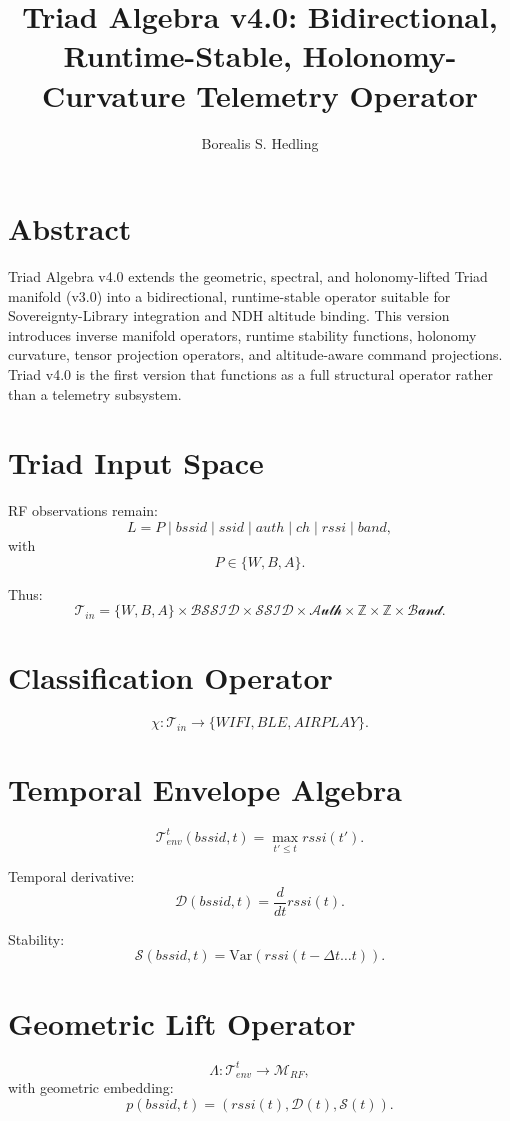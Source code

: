 \documentclass[11pt]{article}
\title{Triad Algebra v4.0: Bidirectional, Runtime-Stable, Holonomy-Curvature Telemetry Operator}
\author{Borealis S. Hedling}
\date{}
\begin{document}
\maketitle

\section*{Abstract}
Triad Algebra v4.0 extends the geometric, spectral, and holonomy-lifted Triad
manifold (v3.0) into a bidirectional, runtime-stable operator suitable for
Sovereignty-Library integration and NDH altitude binding. This version introduces
inverse manifold operators, runtime stability functions, holonomy curvature,
tensor projection operators, and altitude-aware command projections. Triad v4.0
is the first version that functions as a full structural operator rather than a
telemetry subsystem.

\section{Triad Input Space}
RF observations remain:
\[
L = P \mid bssid \mid ssid \mid auth \mid ch \mid rssi \mid band,
\]
with
\[
P \in \{W, B, A\}.
\]

Thus:
\[
\mathcal{T}_{in}
= \{W,B,A\}
\times \mathcal{BSSID}
\times \mathcal{SSID}
\times \mathcal{Auth}
\times \mathbb{Z}
\times \mathbb{Z}
\times \mathcal{Band}.
\]

\section{Classification Operator}
\[
\chi : \mathcal{T}_{in} \to \{WIFI, BLE, AIRPLAY\}.
\]

\section{Temporal Envelope Algebra}
\[
\mathcal{T}_{env}^{t}(bssid,t)
= \max_{t' \le t} rssi(t').
\]

Temporal derivative:
\[
\mathcal{D}(bssid,t) = \frac{d}{dt} rssi(t).
\]

Stability:
\[
\mathcal{S}(bssid,t) = \mathrm{Var}(rssi(t-\Delta t \ldots t)).
\]

\section{Geometric Lift Operator}
\[
\Lambda : \mathcal{T}_{env}^{t} \to \mathcal{M}_{RF},
\]
with geometric embedding:
\[
p(bssid,t) = (rssi(t), \mathcal{D}(t), \mathcal{S}(t)).
\]
\end{document}
